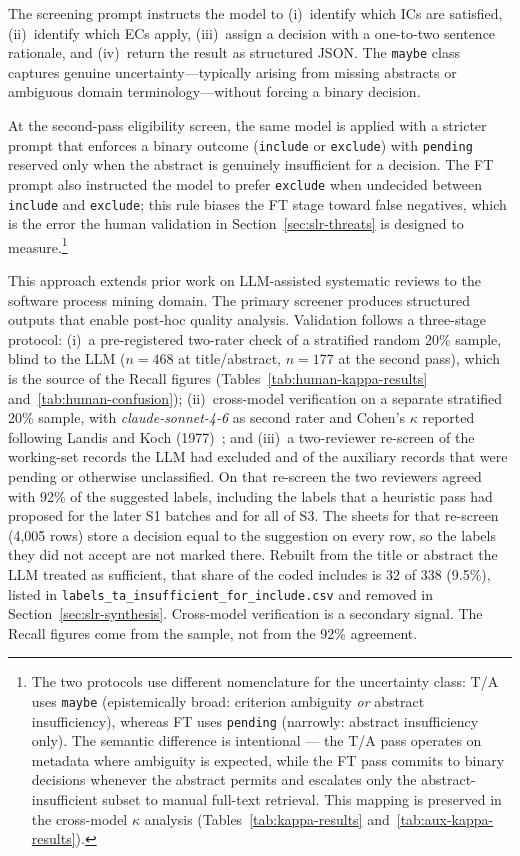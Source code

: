 The screening prompt instructs the model to (i)~identify which ICs are
satisfied, (ii)~identify which ECs apply, (iii)~assign a decision with a
one-to-two sentence rationale, and (iv)~return the result as structured
JSON. The \texttt{maybe} class captures genuine uncertainty---typically
arising from missing abstracts or ambiguous domain terminology---without
forcing a binary decision.

At the second-pass eligibility screen, the same model is applied with a stricter
prompt that enforces a binary outcome (\texttt{include} or \texttt{exclude})
with \texttt{pending} reserved only when the abstract is genuinely
insufficient for a decision. The FT prompt also instructed the model to
prefer \texttt{exclude} when undecided between \texttt{include} and
\texttt{exclude}; this rule biases the FT stage toward false negatives, which
is the error the human validation in Section~\ref{sec:slr-threats} is
designed to measure.\footnote{The two protocols use different
nomenclature for the uncertainty class: T/A uses \texttt{maybe}
(epistemically broad: criterion ambiguity \emph{or} abstract
insufficiency), whereas FT uses \texttt{pending} (narrowly: abstract
insufficiency only). The semantic difference is intentional --- the
T/A pass operates on metadata where ambiguity is expected, while the FT
pass commits to binary decisions whenever the abstract permits and
escalates only the abstract-insufficient subset to manual full-text
retrieval. This mapping is preserved in the cross-model $\kappa$ analysis
(Tables~\ref{tab:kappa-results} and~\ref{tab:aux-kappa-results}).}

This approach extends prior work on LLM-assisted systematic reviews
\cite{syriani2023,khraisha2024,llm4screenlit2025} to the software process
mining domain. The primary screener produces structured outputs that enable
post-hoc quality analysis. Validation follows a three-stage protocol:
(i)~a pre-registered two-rater check of a stratified random 20\% sample,
blind to the LLM ($n=468$ at title/abstract, $n=177$ at the second pass),
which is the source of the Recall figures
(Tables~\ref{tab:human-kappa-results} and~\ref{tab:human-confusion});
(ii)~cross-model verification on a separate stratified 20\% sample, with
\textit{claude-sonnet-4-6} as second rater and Cohen's $\kappa$ reported
following Landis and Koch (1977)~\cite{landiskoch1977}; and
(iii)~a two-reviewer re-screen of the working-set records the LLM had
excluded and of the auxiliary records that were pending or otherwise
unclassified. On that re-screen the two reviewers agreed with 92\% of the
suggested labels, including the labels that a heuristic pass had proposed
for the later S1 batches and for all of S3. The sheets for that re-screen
(4{,}005 rows) store a decision equal to the suggestion on every row, so
the labels they did not accept are not marked there. Rebuilt from the
title or abstract the LLM treated as sufficient, that share of the coded
includes is 32 of 338 (9.5\%), listed in
\texttt{labels\_ta\_insufficient\_for\_include.csv} and removed in
Section~\ref{sec:slr-synthesis}.
Cross-model verification is a secondary signal. The Recall figures come
from the sample, not from the 92\% agreement.

